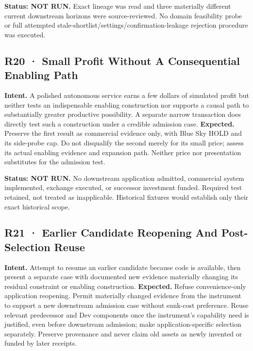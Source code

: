 \documentclass[10pt,letterpaper]{article}
\begin{document}
\textbf{Status: NOT RUN.} Exact lineage was read and three materially
different current downstream horizons were source-reviewed. No domain
feasibility probe or full attempted
stale-shortlist/settings/confirmation-leakage rejection procedure was
executed.

\hypertarget{r20-small-profit-without-a-consequential-enabling-path}{%
\subsection{R20 · Small Profit Without A Consequential Enabling
Path}\label{r20-small-profit-without-a-consequential-enabling-path}}

\textbf{Intent.} A polished autonomous service earns a few dollars of
simulated profit but neither tests an indispensable enabling
construction nor supports a causal path to substantially greater
productive possibility. A separate narrow transaction does directly test
such a construction under a credible admission case. \textbf{Expected.}
Preserve the first result as commercial evidence only, with Blue Sky
HOLD and its side-probe cap. Do not disqualify the second merely for its
small price; assess its actual enabling evidence and expansion path.
Neither price nor presentation substitutes for the admission test.

\textbf{Status: NOT RUN.} No downstream application admitted, commercial
system implemented, exchange executed, or successor investment funded.
Required test retained, not treated as inapplicable. Historical fixtures
would establish only their exact historical scope.

\hypertarget{r21-earlier-candidate-reopening-and-post-selection-reuse}{%
\subsection{R21 · Earlier Candidate Reopening And Post-Selection
Reuse}\label{r21-earlier-candidate-reopening-and-post-selection-reuse}}

\textbf{Intent.} Attempt to resume an earlier candidate because code is
available, then present a separate case with documented new evidence
materially changing its residual constraint or enabling construction.
\textbf{Expected.} Refuse convenience-only application reopening. Permit
materially changed evidence from the instrument to support a new
downstream admission case without sunk-cost preference. Reuse relevant
predecessor and Dev components once the instrument's capability need is
justified, even before downstream admission; make application-specific
selection separately. Preserve provenance and never claim old assets as
newly invented or funded by later receipts.
\end{document}
